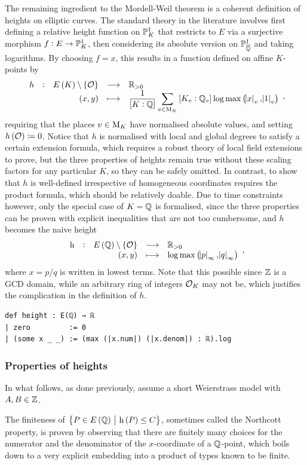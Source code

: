 The remaining ingredient to the Mordell-Weil theorem is a coherent definition of heights on elliptic curves. The standard theory in the literature \cite[Section VIII.6]{Sil09} involves first defining a relative height function on $ \mathbb{P}_K^1 $ that restricts to $ E $ via a surjective morphism $ f : E \to \mathbb{P}_K^1 $, then considering its absolute version on $ \mathbb{P}_{\overline{\mathbb{Q}}}^1 $ and taking logarithms. By choosing $ f = x $, this results in a function defined on affine $ K $-points by
$$ \function[h]{E\br{K} \setminus \cbr{\OOO}}{\RR_{> 0}}{\br{x, y}}{\dfrac{1}{\sbr{K : \QQ}}\sum_{v \in \M_K} \sbr{K_v : \QQ_v} \log \max\br{\abs{x}_v, \abs{1}_v}}, $$
requiring that the places $ v \in \mathrm{M}_K $ have normalised absolute values, and setting $ h\br{\OOO} \coloneqq 0 $. Notice that $ h $ is normalised with local and global degrees to satisfy a certain extension formula, which requires a robust theory of local field extensions to prove, but the three properties of heights remain true without these scaling factors for any particular $ K $, so they can be safely omitted. In contrast, to show that $ h $ is well-defined irrespective of homogeneous coordinates requires the product formula, which should be relatively doable. Due to time constraints however, only the special case of $ K = \mathbb{Q} $ is formalised, since the three properties can be proven with explicit inequalities that are not too cumbersome, and $ h $ becomes the naive height
$$ \function[\h]{E\br{\QQ} \setminus \cbr{\OOO}}{\RR_{> 0}}{\br{x, y}}{\log \max\br{\abs{p}_\infty, \abs{q}_\infty}}, $$
where $ x = p / q $ is written in lowest terms. Note that this possible since $ \mathbb{Z} $ is a GCD domain, while an arbitrary ring of integers $ \mathcal{O}_K $ may not be, which justifies the complication in the definition of $ h $.

\begin{lstlisting}[frame=single]
def height : E(ℚ) → ℝ
| zero         := 0
| (some x _ _) := (max (|x.num|) (|x.denom|) : ℝ).log
\end{lstlisting}

\subsubsection{Properties of heights}

In what follows, as done previously, assume a short Weierstrass model with $ A, B \in \mathbb{Z} $.

The finiteness of $ \cbr{P \in E\br{\QQ} \st \h\br{P} \le C} $, sometimes called the Northcott property, is proven by observing that there are finitely many choices for the numerator and the denominator of the $ x $-coordinate of a $ \mathbb{Q} $-point, which boils down to a very explicit embedding into a product of types known to be finite.

